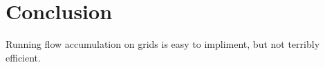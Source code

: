 \documentclass[11pt,twocolumn]{article}
\begin{document}
\begin{table}[htp]
  \caption{Running times (seconds) and CPU-utilization for
    \texttt{flowaccu}.}
  \label{tbl:runaccu}
\end{table}



\section{Conclusion}
Running flow accumulation on grids is easy to impliment, but not terribly efficient.
\end{document}

